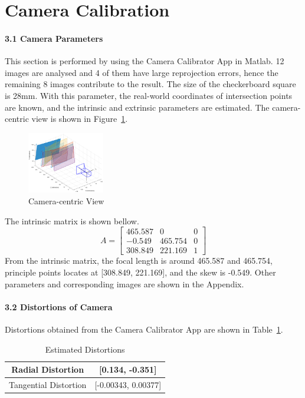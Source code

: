 \documentclass[10pt,twocolumn,letterpaper]{article}
\begin{document}
\section{Camera Calibration}

\paragraph{3.1 Camera Parameters}
This section is performed by using the Camera Calibrator App in Matlab. 12 images are analysed and 4 of them have large reprojection errors, hence the remaining 8 images contribute to the result. The size of the checkerboard square is 28mm. With this parameter, the real-world coordinates of intersection points are known, and the intrinsic and extrinsic parameters are estimated. The camera-centric view is shown in Figure~\ref{fig:3}.
\begin{figure}[h]
\begin{center}
   \includegraphics[width=0.30\textwidth]{3.1}
\end{center}
   \caption{Camera-centric View}
\label{fig:3}
\end{figure}

\noindent The intrinsic matrix is shown bellow.
$$A=\begin{bmatrix}
465.587 & 0 & 0\\ 
-0.549 & 465.754 & 0\\ 
308.849 & 221.169 & 1
\end{bmatrix}$$
From the intrinsic matrix, the focal length is around 465.587 and 465.754, principle points locates at [308.849, 221.169], and the skew is -0.549. Other parameters and corresponding images are shown in the Appendix.


\paragraph{3.2 Distortions of Camera}
Distortions obtained from the Camera Calibrator App are shown in Table~\ref{tab:2}.
\begin{table}[h]
\small
    \centering
    \begin{tabular}{c|c}
        Radial Distortion & [0.134, -0.351]\\
        \hline
        Tangential Distortion & [-0.00343, 0.00377]\\ 
    \end{tabular}%
    \medbreak
    \caption{Estimated Distortions}
    \label{tab:2}
\end{table}
\end{document}
